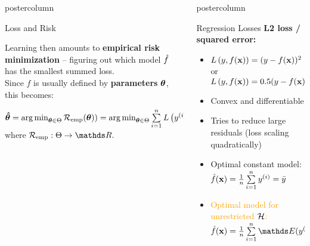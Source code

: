 \documentclass{beamer}
\newlength{\columnheight} %
\begin{document}
\begin{frame}[fragile]{}
\begin{columns}
\begin{column}{.31\textwidth}
\begin{beamercolorbox}[center]{postercolumn}
\begin{minipage}{.98\textwidth}
{\begin{myblock}{Loss and Risk}
  
Learning then amounts to \textbf{empirical risk minimization} -- figuring out which model $\hat{f}$ has the smallest summed loss. \\ 
Since $f$ is usually defined by \textbf{parameters} $\bm{\theta}$, this becomes:

\begin{center}
$\bm{\hat\theta} = \operatorname{arg\,min}_{\bm{\theta} \in \Theta} \mathcal{R}_{\text{emp}}(\bm{\theta})) = \operatorname{arg\,min}_{\bm{\theta} \in \Theta} \sum\limits_{i=1}^n L\left(y^{(i)}, f\left(\mathbf{x}^{(i)} ~|~ \bm{\theta}\right)\right),$ \\
where $\riske : \Theta \to \R.$
\end{center}

\end{myblock}





				}
			\end{minipage}
		\end{beamercolorbox}
	\end{column}
	\begin{column}{.31\textwidth}
		\begin{beamercolorbox}[center]{postercolumn}
			\begin{minipage}{.98\textwidth}
				\parbox[t][\columnheight]{\textwidth}{


\begin{myblock}{Regression Losses}
  \textbf{L2 loss / squared error:} 
\begin{itemize}    
  \setlength{\itemindent}{+.3in}
  \item $L\left(y, f(\mathbf{x})\right) = (y-f(\mathbf{x}))^2$ or $L\left(y, f(\mathbf{x})\right) = 0.5 (y-f(\mathbf{x}))^2$
  \item Convex and differentiable
  \item Tries to reduce large residuals (loss scaling quadratically)
  \item Optimal constant model: $\hat{f}(\mathbf{x}) = \frac{1}{n} \sum\limits_{i=1}^n y^{(i)} =
  \bar{y}$
  \item \textcolor{orange}{Optimal model for unrestricted $\mathcal{H}$: $\fxh = \meanin\E (\yi | \xi)$}
\end{itemize}


\end{myblock}}
\end{minipage}
\end{beamercolorbox}
\end{column}
\end{columns}
\end{frame}
\end{document}
